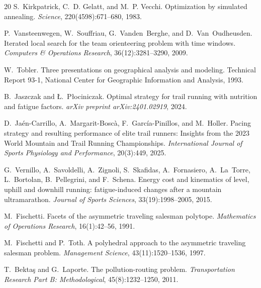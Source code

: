 \documentclass[11pt,a4paper]{article}
\begin{document}
\begin{thebibliography}{20}
S.~Kirkpatrick, C.~D. Gelatt, and M.~P. Vecchi.
\newblock Optimization by simulated annealing.
\newblock \emph{Science}, 220(4598):671--680, 1983.

P.~Vansteenwegen, W.~Souffriau, G.~Vanden~Berghe, and D.~Van~Oudheusden.
\newblock Iterated local search for the team orienteering problem with time windows.
\newblock \emph{Computers \& Operations Research}, 36(12):3281--3290, 2009.

W.~Tobler.
\newblock Three presentations on geographical analysis and modeling.
\newblock Technical Report 93-1, National Center for Geographic Information and Analysis, 1993.

B.~Jaszczak and {\L}.~P{\l}ociniczak.
\newblock Optimal strategy for trail running with nutrition and fatigue factors.
\newblock \emph{arXiv preprint arXiv:2401.02919}, 2024.

D.~Ja{\'e}n-Carrillo, A.~Margarit-Bosc{\`a}, F.~Garc{\'i}a-Pinillos, and M.~Holler.
\newblock Pacing strategy and resulting performance of elite trail runners: Insights from the 2023 World Mountain and Trail Running Championships.
\newblock \emph{International Journal of Sports Physiology and Performance}, 20(3):449, 2025.

G.~Vernillo, A.~Savoldelli, A.~Zignoli, S.~Skafidas, A.~Fornasiero, A.~La~Torre, L.~Bortolan, B.~Pellegrini, and F.~Schena.
\newblock Energy cost and kinematics of level, uphill and downhill running: fatigue-induced changes after a mountain ultramarathon.
\newblock \emph{Journal of Sports Sciences}, 33(19):1998--2005, 2015.

M.~Fischetti.
\newblock Facets of the asymmetric traveling salesman polytope.
\newblock \emph{Mathematics of Operations Research}, 16(1):42--56, 1991.

M.~Fischetti and P.~Toth.
\newblock A polyhedral approach to the asymmetric traveling salesman problem.
\newblock \emph{Management Science}, 43(11):1520--1536, 1997.

T.~Bekta\c{s} and G.~Laporte.
\newblock The pollution-routing problem.
\newblock \emph{Transportation Research Part B: Methodological}, 45(8):1232--1250, 2011.


\end{thebibliography}
\end{document}
